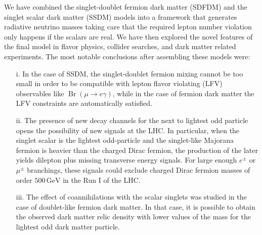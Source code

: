 We have combined the singlet-doublet fermion dark matter (SDFDM) and
the singlet scalar dark matter (SSDM) models into a framework that generates radiative neutrino masses
taking care that the required lepton number violation only happens if the scalars are
real.   
We have then explored the novel features of the final model in flavor
physics, collider searches, and dark matter related experiments.  
The most notable conclusions after assembling these models were:
\begin{enumerate}
\item[i.] In the case of SSDM, the singlet-doublet fermion mixing
cannot be too small in order to be compatible with lepton flavor
violating (LFV) observables like $\operatorname{Br}(\mu\to e\gamma)$, 
while in the case of fermion dark matter the LFV constraints are
automatically satisfied.
\item[ii.] The presence of new decay channels for the next to lightest odd
particle opens the possibility of new signals at the LHC.
In particular, when the singlet scalar is the lightest
odd-particle and the singlet-like Majorana fermion is heavier than the
charged Dirac fermion, the production of the later yields dilepton plus missing transverse energy signals. 
For large enough $e^\pm$ or $\mu^\pm$ branchings, these signals could exclude charged
Dirac fermion masses of order $500\,\text{GeV}$ in the Run I of the LHC. 
\item[iii.] The effect of coannihilations with the scalar singlets was
studied in the case of doublet-like fermion dark matter.  In that
case, it is possible to obtain the observed dark matter relic density
with lower values of the mass for the lightest odd dark matter particle.
\end{enumerate}



